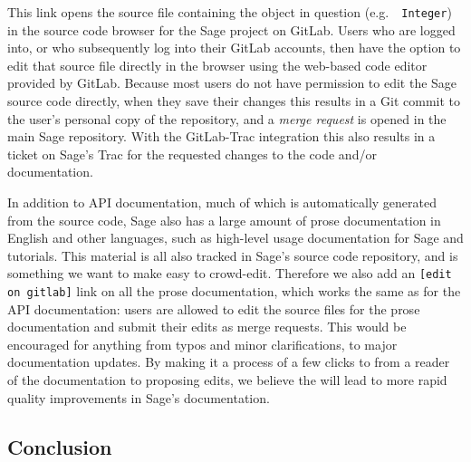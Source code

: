 This link opens the source file containing the object in question (e.g.~{\tt
Integer}) in the source code browser for the Sage project on GitLab.  Users
who are logged into, or who subsequently log into their GitLab accounts, then
have the option to edit that source file directly in the browser using the
web-based code editor provided by GitLab.  Because most users do not have
permission to edit the Sage source code directly, when they save their changes
this results in a Git commit to the user's personal copy of the repository,
and a {\em merge request} is opened in the main Sage repository.  With the
GitLab-Trac integration this also results in a ticket on Sage's Trac for the
requested changes to the code and/or documentation.

In addition to API documentation, much of which is automatically generated from
the source code, Sage also has a large amount of prose documentation in English
and other languages, such as high-level usage documentation for Sage and
tutorials.  This material is all also tracked in Sage's source code repository,
and is something we want to make easy to crowd-edit.  Therefore we also add an
{\tt [edit on gitlab]} link on all the prose documentation, which works the
same as for the API documentation: users are allowed to edit the source files
for the prose documentation and submit their edits as merge requests.  This
would be encouraged for anything from typos and minor clarifications, to
major documentation updates.  By making it a process of a few clicks to from
a reader of the documentation to proposing edits, we believe the will lead
to more rapid quality improvements in Sage's documentation.


\hypertarget{conclusion}{%
\subsection{Conclusion}\label{conclusion}}






